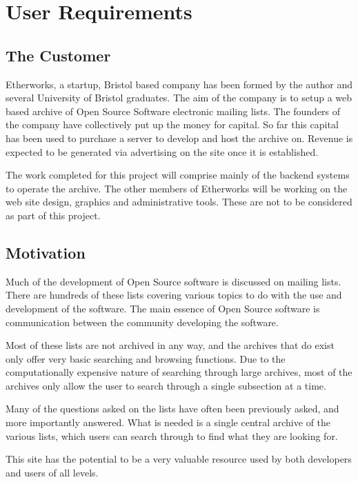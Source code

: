 
\chapter{User Requirements}
\label{require}
\section{The Customer}
Etherworks, a startup, Bristol based company has been formed by the
author and several University of Bristol graduates.  The aim of the
company is to setup a web based archive of Open Source Software
\cite{www:opensource} electronic mailing lists.  The founders of the company 
have collectively put up the money for capital.  So far this capital has been used to purchase a server to develop and host the archive on.  Revenue is expected to be generated via advertising on the site once it is established.

The work completed for this project will comprise mainly of the backend systems to operate the archive.  The other members of Etherworks will be working on the web site design, graphics and administrative tools.  These are not to be considered as part of this project.

\section{Motivation}
Much of the development of Open Source software is discussed on mailing
lists.  There are hundreds of these lists covering various topics to do
with the use and development of the software.  The main essence of
Open Source software is communication between the community developing the
software.  

Most of these lists are not archived in any way, and the
archives that do exist only offer very basic searching and browsing
functions.  Due to the computationally expensive nature of searching
through large archives, most of the archives only allow the user to search
through a single subsection at a time.

Many of the questions asked on the lists have often been previously asked,
and more importantly answered.  What is needed is a single central archive
of the various lists, which users can search through to find what they are
looking for.

This site has the potential to be a very valuable resource used by
both developers and users of all levels.

